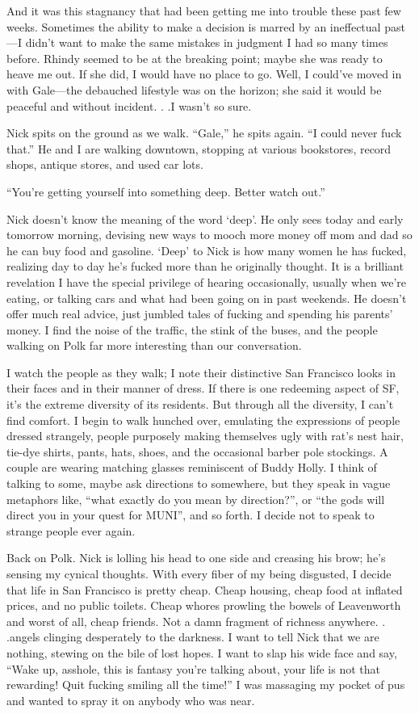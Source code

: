 And it was this stagnancy that had been getting me into trouble these
past few weeks. Sometimes the ability to make a decision is marred by an
ineffectual past---I didn't want to make the same mistakes in judgment I
had so many times before. Rhindy seemed to be at the breaking point;
maybe she was ready to heave me out. If she did, I would have no place
to go. Well, I could've moved in with Gale---the debauched lifestyle was
on the horizon; she said it would be peaceful and without incident. . .I
wasn't so sure.

Nick spits on the ground as we walk. ``Gale,'' he spits again. ``I could
never fuck that.'' He and I are walking downtown, stopping at various
bookstores, record shops, antique stores, and used car lots.

``You're getting yourself into something deep. Better watch out.''

Nick doesn't know the meaning of the word `deep'. He only sees today and
early tomorrow morning, devising new ways to mooch more money off mom
and dad so he can buy food and gasoline. `Deep' to Nick is how many
women he has fucked, realizing day to day he's fucked more than he
originally thought. It is a brilliant revelation I have the special
privilege of hearing occasionally, usually when we're eating, or talking
cars and what had been going on in past weekends. He doesn't offer much
real advice, just jumbled tales of fucking and spending his parents'
money. I find the noise of the traffic, the stink of the buses, and the
people walking on Polk far more interesting than our conversation.

I watch the people as they walk; I note their distinctive San Francisco
looks in their faces and in their manner of dress. If there is one
redeeming aspect of SF, it's the extreme diversity of its residents. But
through all the diversity, I can't find comfort. I begin to walk hunched
over, emulating the expressions of people dressed strangely, people
purposely making themselves ugly with rat's nest hair, tie-dye shirts,
pants, hats, shoes, and the occasional barber pole stockings. A couple
are wearing matching glasses reminiscent of Buddy Holly. I think of
talking to some, maybe ask directions to somewhere, but they speak in
vague metaphors like, ``what exactly do you mean by direction?'', or
``the gods will direct you in your quest for MUNI'', and so forth. I
decide not to speak to strange people ever again.

Back on Polk. Nick is lolling his head to one side and creasing his
brow; he's sensing my cynical thoughts. With every fiber of my being
disgusted, I decide that life in San Francisco is pretty cheap. Cheap
housing, cheap food at inflated prices, and no public toilets. Cheap
whores prowling the bowels of Leavenworth and worst of all, cheap
friends. Not a damn fragment of richness anywhere. . .angels clinging
desperately to the darkness. I want to tell Nick that we are nothing,
stewing on the bile of lost hopes. I want to slap his wide face and say,
``Wake up, asshole, this is fantasy you're talking about, your life is
not that rewarding! Quit fucking smiling all the time!'' I was massaging
my pocket of pus and wanted to spray it on anybody who was near.

